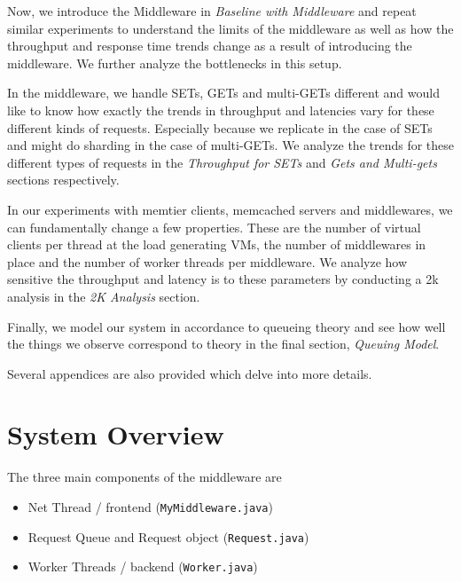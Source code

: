 \documentclass[11pt,a4paper]{article}
\newcommand\instructions[1]{\textcolor{blue}{Instructions: #1}}
\begin{document}
Now, we introduce the Middleware in \emph{Baseline with Middleware} and repeat similar experiments to understand the limits of the middleware as well as how the throughput and response time trends change as a result of introducing the middleware. We further analyze the bottlenecks in this setup.

In the middleware, we handle SETs, GETs and multi-GETs different and would like to know how exactly the trends in throughput and latencies vary for these different kinds of requests. Especially because we replicate in the case of SETs and might do sharding in the case of multi-GETs. We analyze the trends for these different types of requests in the \emph{Throughput for SETs} and \emph{Gets and Multi-gets} sections respectively.

In our experiments with memtier clients, memcached servers and middlewares, we can fundamentally change a few properties. These are the number of virtual clients per thread at the load generating VMs, the number of middlewares in place and the number of worker threads per middleware. We analyze how sensitive the throughput and latency is to these parameters by conducting a 2k analysis in the \emph{2K Analysis} section. 

Finally, we model our system in accordance to queueing theory and see how well the things we observe correspond to theory in the final section, \emph{Queuing Model}.

Several appendices are also provided which delve into more details.


\section{System Overview} %

The three main components of the middleware are
\begin{itemize}
	  \setlength{\itemsep}{0pt}
	  \setlength{\parskip}{0pt}
	  \setlength{\parsep}{0pt}
	\item Net Thread / frontend  (\texttt{MyMiddleware.java})
	\item Request Queue and Request object (\texttt{Request.java})
	\item Worker Threads / backend (\texttt{Worker.java})
\end{itemize}
\end{document}
